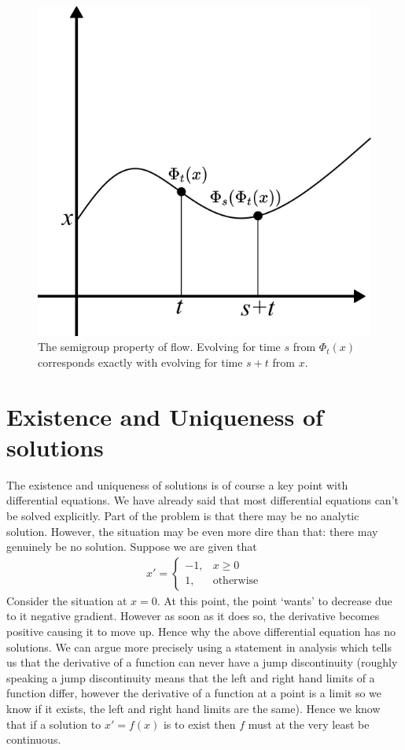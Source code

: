 \begin{figure}[ht]
    \centering
    \includegraphics[scale=0.7]{Images/flow_semigroup.png}
    \caption{The semigroup property of flow. Evolving for time $s$ from $\Phi_t(x)$ corresponds exactly with evolving for time $s + t$ from $x$.}
    \label{fig:flow-semigroup-prop}
\end{figure}


\section{Existence and Uniqueness of solutions}
The existence and uniqueness of solutions is of course a key point with differential equations. We have already said that most differential equations can't be solved explicitly. Part of the problem is that there may be no analytic solution. However, the situation may be even more dire than that: there may genuinely be no solution. Suppose we are given that
\begin{align*}
    x' = \begin{cases}
    -1, & x \geq 0\\
    1, & \text{otherwise}
    \end{cases}
\end{align*}
Consider the situation at $x = 0$. At this point, the point `wants' to decrease due to it negative gradient. However as soon as it does so, the derivative becomes positive causing it to move up. Hence why the above differential equation has no solutions. We can argue more precisely using a statement in analysis which tells us that the derivative of a function can never have a jump discontinuity (roughly speaking a jump discontinuity means that the left and right hand limits of a function differ, however the derivative of a function at a point is a limit so we know if it exists, the left and right hand limits are the same). Hence we know that if a solution to $x' = f(x)$ is to exist then $f$ must at the very least be continuous.

